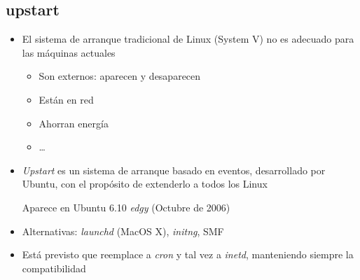 \documentclass[ucs]{beamer}
\begin{document}
\begin{frame}[fragile]

\subsection{upstart}

\begin{itemize}
\item
El sistema de arranque tradicional de Linux (System V)
no es adecuado para las máquinas actuales
\begin{itemize}
\item
Son externos: aparecen y desaparecen
\item
Están en red
\item
Ahorran energía
\item \ldots
\end{itemize}


\item
\emph{Upstart} es un sistema de arranque basado en eventos,
desarrollado por Ubuntu, con el propósito de extenderlo
a todos los Linux

Aparece en Ubuntu 6.10 \emph{edgy} (Octubre de 2006)

\item
Alternativas: \emph{launchd} (MacOS X), \emph{initng},  SMF 

\item
Está previsto que reemplace a \emph{cron} y tal vez a  \emph{inetd}, manteniendo siempre la compatibilidad
\end{itemize}


\end{frame}
\end{document}
